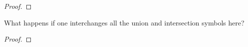 \documentclass[../../main.tex]{subfiles}
\begin{document}
\begin{proof}
    
\end{proof}
\begin{xx}
    
\end{xx}
        
\begin{q}
    What happens if one interchanges all the union and intersection symbols here?
\end{q}

\begin{ans}
    
\end{ans}
    
\begin{proof}
    
\end{proof}
\begin{xx}
    
\end{xx}
\end{document}
